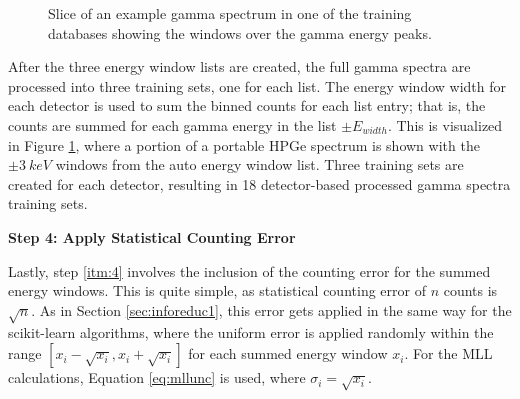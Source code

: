 \begin{figure}[!htb]
  \caption{Slice of an example gamma spectrum in one of the training databases
           showing the windows over the gamma energy peaks.}
  \label{fig:enwindows}
\end{figure}

After the three energy window lists are created, the full gamma spectra are
processed into three training sets, one for each list.  The energy window width
for each detector is used to sum the binned counts for each list entry; that
is, the counts are summed for each gamma energy in the list $\pm E_{width}$.
This is visualized in Figure \ref{fig:enwindows}, where a portion of a portable
\gls{HPGe} spectrum is shown with the $\pm3\:keV$ windows from the auto energy
window list.  Three training sets are created for each detector, resulting in
18 detector-based processed gamma spectra training sets.

\noindent \textbf{Step 4: Apply Statistical Counting Error}

Lastly, step \ref{itm:4} involves the inclusion of the counting error for the
summed energy windows. This is quite simple, as statistical counting error of
$n$ counts is $\sqrt{n}$.  As in Section \ref{sec:inforeduc1}, this error gets
applied in the same way for the scikit-learn algorithms, where the uniform
error is applied randomly within the range $[x_i - \sqrt{x_i}, x_i +
\sqrt{x_i}]$ for each summed energy window $x_i$. For the \gls{MLL}
calculations, Equation \ref{eq:mllunc} is used, where $\sigma_{i} =
\sqrt{x_i}$.  
